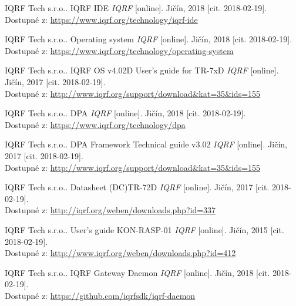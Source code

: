 \documentclass[12pt,a4paper]{article}
\begin{document}

\newpage

\printindex[zkr]


\newpage

\begin{thebibliography}{99}


IQRF Tech s.r.o.. IQRF IDE \emph{IQRF} [online]. Jičín, 2018 [cit. 2018-02-19]. \\ Dostupné z: \url{https://www.iqrf.org/technology/iqrf-ide}

IQRF Tech s.r.o.. Operating system \emph{IQRF} [online]. Jičín, 2018 [cit. 2018-02-19]. \\ Dostupné z: \url{https://www.iqrf.org/technology/operating-system}

IQRF Tech s.r.o.. IQRF OS v4.02D User's guide for TR-7xD \emph{IQRF} [online]. Jičín, 2017 [cit. 2018-02-19]. \\ Dostupné z: \url{http://www.iqrf.org/support/download&kat=35&ids=155}

IQRF Tech s.r.o.. DPA \emph{IQRF} [online]. Jičín, 2018 [cit. 2018-02-19]. \\ Dostupné z: \url{https://www.iqrf.org/technology/dpa}

IQRF Tech s.r.o.. DPA Framework Technical guide v3.02 \emph{IQRF} [online]. Jičín, 2017 [cit. 2018-02-19]. \\ Dostupné z: \url{http://www.iqrf.org/support/download&kat=35&ids=155}

IQRF Tech s.r.o.. Datasheet (DC)TR-72D \emph{IQRF} [online]. Jičín, 2017 [cit. 2018-02-19]. \\ Dostupné z: \url{http://iqrf.org/weben/downloads.php?id=337}

IQRF Tech s.r.o.. User's guide KON-RASP-01 \emph{IQRF} [online]. Jičín, 2015 [cit. 2018-02-19]. \\ Dostupné z: \url{http://www.iqrf.org/weben/downloads.php?id=412}

IQRF Tech s.r.o.. IQRF Gateway Daemon \emph{IQRF} [online]. Jičín, 2018 [cit. 2018-02-19]. \\ Dostupné z: \url{https://github.com/iqrfsdk/iqrf-daemon}


\end{thebibliography}
\end{document}

